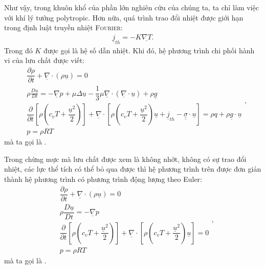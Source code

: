 \documentclass[../../../main.tex]{subfiles}
\begin{document}
    Như vậy, trong khuôn khổ của phần lớn nghiên cứu của chúng ta, ta chỉ làm việc với khí lý tưởng polytropic. Hơn nữa, quá trình trao đổi nhiệt được giới hạn trong định luật truyền nhiệt \textsc{Fourier}:
    	\begin{align}
    		\underline{j}_{th}=-K\underline{\nabla T}.
    	\end{align}
    Trong đó $K$ được gọi là hệ số dẫn nhiệt. Khi đó, hệ phương trình chi phối hành vi của lưu chất được viết:
        \begin{equation}\label{eq:reel}
            \boxed{
                \begin{aligned}
                    &\dfrac{\partial\rho}{\partial t}+\underline{\nabla}\cdot\left(\rho\underline{u}\right)=0\\[10pt]
                    &\rho\frac{D\underline{u}}{Dt}=-\underline{\nabla}p+\mu\Delta\underline{u}-\dfrac{1}{3}\mu\underline{\nabla}\cdot\left(\underline{\nabla}\cdot\underline{u}\right)+\rho\underline{g}\\[10pt]
                    &\dfrac{\partial}{\partial t}\left[\rho\left(c_vT+\dfrac{\underline{u}^2}{2}\right)\right]+\underline{\nabla}\cdot\left[\rho\left(c_vT+\dfrac{\underline{u}^2}{2}\right)\underline{u}+\underline{j}_{th}-\underline{\underline{\sigma}}\cdot\underline{u}\right]=\rho q+\rho\underline{g}\cdot\underline{u}\\[10pt]
                    &p=\rho RT
                \end{aligned}
            },
        \end{equation}
    mà ta gọi là .

    Trong chừng mực mà lưu chất được xem là không nhớt, không có sự trao đổi nhiệt, các lực thể tích có thể bỏ qua được thì hệ phương trình trên được đơn giản thành hệ phương trình có phương trình động lượng theo Euler:
        \begin{equation}\label{eq:parfait}
            \boxed{
                \begin{aligned}
                    &\dfrac{\partial\rho}{\partial t}+\underline{\nabla}\cdot\left(\rho \underline{u}\right)=0\\[10pt]
                    &\rho\dfrac{D\underline{u}}{Dt}=-\underline{\nabla}p\\[10pt]
                    &\dfrac{\partial}{\partial t}\left[\rho\left(c_vT+\dfrac{ \underline{u}^2}{2}\right)\right]+\underline{\nabla}\cdot\left[\rho\left(c_vT+\dfrac{\underline{u}^2}{2}\right)\underline{u} \right]=0\\[10pt]
                    &p=\rho RT
                \end{aligned}
	        },
        \end{equation}
    mà ta gọi là .
\end{document}
